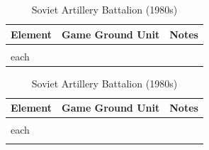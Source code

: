 \begin{itemize}
\begin{table}[p]
            \vspace{\floatsep}

            \caption{Soviet Self-Propelled Artillery Battalion (1980s)}
            \label{table:ob-soviet-self-propelled-artillery-battalion-1980s}
            \begin{tabularx}{0.9\linewidth}{LLL}
                \toprule
                Element&Game Ground Unit&Notes\\
                \midrule
                &\\

                 each
                &&\\

                \bottomrule
            \end{tabularx}

            \vspace{\floatsep}

            \caption{Soviet Artillery Battalion (1980s)}
            \label{table:ob-soviet-artillery-battalion-1980s}
            \begin{tabularx}{0.9\linewidth}{LLL}
                \toprule
                Element&Game Ground Unit&Notes\\
                \midrule
                &\\

                 each
                &&\\
                &&\\

                \bottomrule
            \end{tabularx}

        \end{table}

        \begin{table}[p]
            \centering\footnotesize


\end{table}
\end{itemize}
